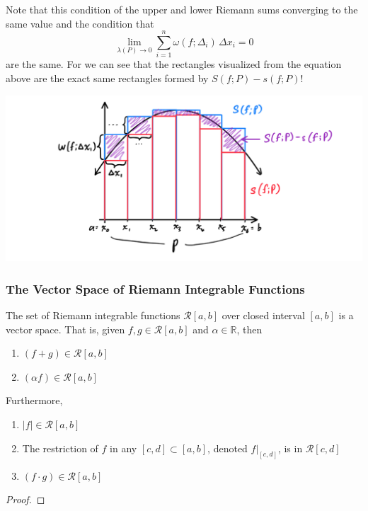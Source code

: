   Note that this condition of the upper and lower Riemann sums converging to the same value and the condition that 
  \[\lim_{\lambda(P) \rightarrow 0} \sum_{i = 1}^n \omega (f; \Delta_i) \, \Delta x_i = 0\]
  are the same. For we can see that the rectangles visualized from the equation above are the exact same rectangles formed by $S(f; P) - s(f; P)$! 
  \begin{center}
      \includegraphics[scale=0.3]{img/Equivalent_Conditions_for_Integrability.PNG}
  \end{center}

  \subsubsection{The Vector Space of Riemann Integrable Functions}

  \begin{theorem}
  The set of Riemann integrable functions $\mathcal{R}[a, b]$ over closed interval $[a, b]$ is a vector space. That is, given $f, g \in \mathcal{R}[a, b]$ and $\alpha \in \mathbb{R}$, then
  \begin{enumerate}
    \item $(f + g) \in \mathcal{R}[a, b]$ 
    \item $(\alpha f) \in \mathcal{R}[a, b]$
  \end{enumerate}
  Furthermore, 
  \begin{enumerate}
    \item $|f| \in \mathcal{R}[a, b]$
    \item The restriction of $f$ in any $[c, d] \subset [a, b]$, denoted $f \big|_{[c,d]}$, is in $\mathcal{R}[c,d]$
    \item $(f \cdot g) \in \mathcal{R}[a, b]$
  \end{enumerate}
  \end{theorem}
  \begin{proof}

  \end{proof}

